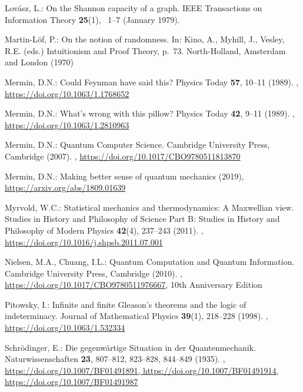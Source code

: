 \documentclass[runningheads]{llncs}
\begin{document}
\begin{thebibliography}{10}
Lov\'asz, L.: On the {S}hannon capacity of a graph. IEEE Transactions on
  Information Theory  \textbf{25}(1), ~1--7 (January 1979).

Martin-L{\"{o}}f, P.: On the notion of randomness. In: Kino, A., Myhill, J.,
  Vesley, R.E. (eds.) Intuitionism and Proof Theory, p.~73. North-Holland,
  Amsterdam and London (1970)

Mermin, D.N.: Could {F}eynman have said this? Physics Today  \textbf{57},
  10--11 (1989). ,
  \url{https://doi.org/10.1063/1.1768652}

Mermin, D.N.: What's wrong with this pillow? Physics Today  \textbf{42},  9--11
  (1989). , \url{https://doi.org/10.1063/1.2810963}

Mermin, D.N.: Quantum Computer Science. Cambridge University Press, Cambridge
  (2007). ,
  \url{https://doi.org/10.1017/CBO9780511813870}

Mermin, D.N.: Making better sense of quantum mechanics (2019),
  \url{https://arxiv.org/abs/1809.01639}

Myrvold, W.C.: Statistical mechanics and thermodynamics: A {M}axwellian view.
  Studies in History and Philosophy of Science Part B: Studies in History and
  Philosophy of Modern Physics  \textbf{42}(4),  237--243 (2011).
  ,
  \url{https://doi.org/10.1016/j.shpsb.2011.07.001}

Nielsen, M.A., Chuang, I.L.: Quantum Computation and Quantum Information.
  Cambridge University Press, Cambridge (2010). ,
  \url{https://doi.org/10.1017/CBO9780511976667}, 10th Anniversary Edition

Pitowsky, I.: Infinite and finite {G}leason's theorems and the logic of
  indeterminacy. Journal of Mathematical Physics  \textbf{39}(1),  218--228
  (1998). , \url{https://doi.org/10.1063/1.532334}

Schr{\"{o}}dinger, E.: {D}ie gegenw\"artige {S}ituation in der
  {Q}uantenmechanik. Naturwissenschaften  \textbf{23},  807--812, 823--828,
  844--849 (1935). , \url{https://doi.org/10.1007/BF01491891,
  https://doi.org/10.1007/BF01491914, https://doi.org/10.1007/BF01491987}


\end{thebibliography}
\end{document}
